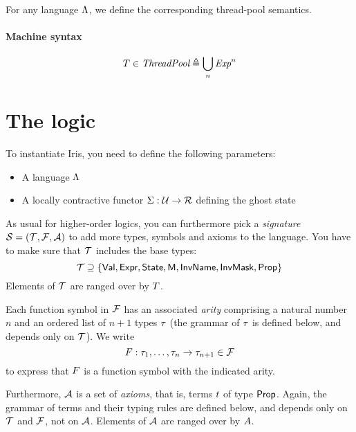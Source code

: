 For any language $\Lambda$, we define the corresponding thread-pool semantics.

\paragraph{Machine syntax}
\[
	T \in \textit{ThreadPool} \triangleq \bigcup_n \textit{Exp}^n
\]

 {\cfg{\tpool}{\state} \step
  }


\section{The logic}

To instantiate Iris, you need to define the following parameters:
\begin{itemize}
\item A language $\Lambda$
\item A locally contractive functor $\Sigma : \mathcal{U} \to \mathcal{R}$ defining the ghost state
\end{itemize}

\noindent
As usual for higher-order logics, you can furthermore pick a \emph{signature} $\mathcal{S} = (\mathcal{T}, \mathcal{F}, \mathcal{A})$ to add more types, symbols and axioms to the language.
You have to make sure that $\mathcal{T}$ includes the base types:
\[
	\mathcal{T} \supseteq \{ \textsf{Val}, \textsf{Expr}, \textsf{State}, \textsf{M}, \textsf{InvName}, \textsf{InvMask}, \textsf{Prop} \}
\]
Elements of $\mathcal{T}$ are ranged over by $T$.

Each function symbol in $\mathcal{F}$ has an associated \emph{arity} comprising a natural number $n$ and an ordered list of $n+1$ types $\tau$ (the grammar of $\tau$ is defined below, and depends only on $\mathcal{T}$).
We write
\[
	F : \tau_1, \dots, \tau_n \to \tau_{n+1} \in \mathcal{F}
\]
to express that $F$ is a function symbol with the indicated arity.

Furthermore, $\mathcal{A}$ is a set of \emph{axioms}, that is, terms $t$ of type $\textsf{Prop}$.
Again, the grammar of terms and their typing rules are defined below, and depends only on $\mathcal{T}$ and $\mathcal{F}$, not on $\mathcal{A}$.
Elements of $\mathcal{A}$ are ranged over by $A$.

